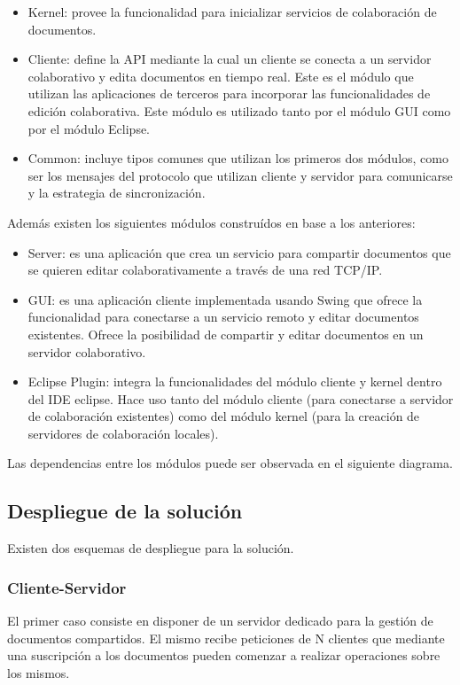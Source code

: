 \documentclass[12pt,a4paper]{article}
\begin{document}
\begin{itemize}
	\item Kernel: provee la funcionalidad para inicializar servicios de colaboración de documentos.
	\item Cliente: define la API mediante la cual un cliente se conecta a un servidor colaborativo y edita documentos
	en tiempo real. Este es el módulo que utilizan las aplicaciones de terceros para incorporar las funcionalidades de
	edición colaborativa. Este módulo es utilizado tanto por el módulo GUI como por el módulo Eclipse.
	\item Common: incluye tipos comunes que utilizan los primeros dos módulos, como ser los mensajes del protocolo que 
	utilizan cliente y servidor para comunicarse y la estrategia de sincronización.
\end{itemize}


Además existen los siguientes módulos construídos en base a los anteriores:
\begin{itemize}
	\item Server: es una aplicación que crea un servicio para compartir documentos que se quieren editar colaborativamente
	a través de una red TCP/IP.
	\item GUI: es una aplicación cliente implementada usando Swing que ofrece la funcionalidad para conectarse a un servicio
	remoto y editar documentos existentes. Ofrece la posibilidad de compartir y editar documentos en un servidor colaborativo.
	\item Eclipse Plugin: integra la funcionalidades del módulo cliente y kernel dentro del IDE eclipse. Hace uso tanto del
	módulo cliente (para conectarse a servidor de colaboración existentes) como del módulo kernel (para la creación de 
	servidores de colaboración locales).
\end{itemize}

Las dependencias entre los módulos puede ser observada en el siguiente diagrama.


\subsection{Despliegue de la solución}
Existen dos esquemas de despliegue para la solución.

\subsubsection{Cliente-Servidor}
El primer caso consiste en disponer de un servidor dedicado para la gestión de documentos compartidos. El mismo recibe
peticiones de N clientes que mediante una suscripción a los documentos pueden comenzar a realizar operaciones sobre los mismos.
\end{document}
